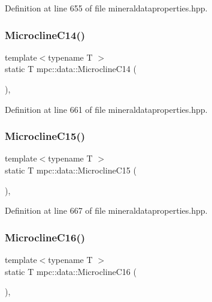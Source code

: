 Definition at line 655 of file mineraldataproperties.\+hpp.

\mbox{\label{namespacempc_1_1data_a3ca77b27b5954b599fe318a1575552d5}} 
\subsubsection{\texorpdfstring{Microcline\+C14()}{MicroclineC14()}}
{\footnotesize\ttfamily template$<$typename T $>$ \\
static T mpc\+::data\+::\+Microcline\+C14 (\begin{DoxyParamCaption}{ }\end{DoxyParamCaption})\hspace{0.3cm}{\ttfamily [inline]}, {\ttfamily [static]}}



Definition at line 661 of file mineraldataproperties.\+hpp.

\mbox{\label{namespacempc_1_1data_aed7d6ec2cbbfc7843b110cd30350dce6}} 
\subsubsection{\texorpdfstring{Microcline\+C15()}{MicroclineC15()}}
{\footnotesize\ttfamily template$<$typename T $>$ \\
static T mpc\+::data\+::\+Microcline\+C15 (\begin{DoxyParamCaption}{ }\end{DoxyParamCaption})\hspace{0.3cm}{\ttfamily [inline]}, {\ttfamily [static]}}



Definition at line 667 of file mineraldataproperties.\+hpp.

\mbox{\label{namespacempc_1_1data_ab55600e0da8105aa8ee8fd9d776f3623}} 
\subsubsection{\texorpdfstring{Microcline\+C16()}{MicroclineC16()}}
{\footnotesize\ttfamily template$<$typename T $>$ \\
static T mpc\+::data\+::\+Microcline\+C16 (\begin{DoxyParamCaption}{ }\end{DoxyParamCaption})\hspace{0.3cm}{\ttfamily [inline]}, {\ttfamily [static]}}




